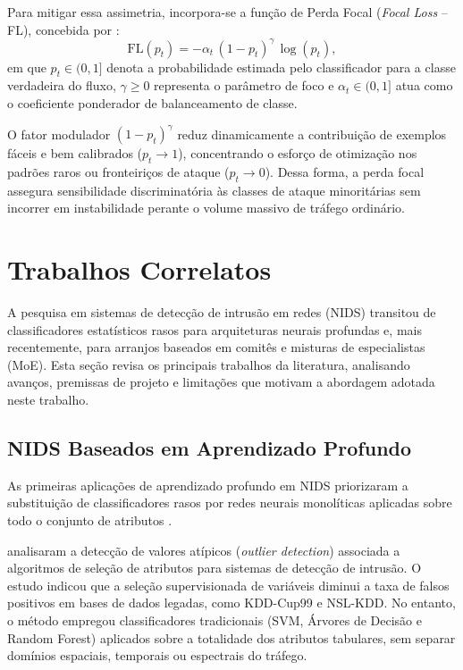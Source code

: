 Para mitigar essa assimetria, incorpora-se a função de Perda Focal (\emph{Focal Loss} -- FL), concebida por :
\begin{equation}
\label{eq:focal_loss_formula}
\mathrm{FL}(p_t) = -\alpha_t \, (1 - p_t)^\gamma \, \log(p_t),
\end{equation}
em que $p_t \in (0, 1]$ denota a probabilidade estimada pelo classificador para a classe verdadeira do fluxo, $\gamma \ge 0$ representa o parâmetro de foco e $\alpha_t \in (0, 1]$ atua como o coeficiente ponderador de balanceamento de classe.

O fator modulador $(1 - p_t)^\gamma$ reduz dinamicamente a contribuição de exemplos fáceis e bem calibrados ($p_t \to 1$), concentrando o esforço de otimização nos padrões raros ou fronteiriços de ataque ($p_t \to 0$). Dessa forma, a perda focal assegura sensibilidade discriminatória às classes de ataque minoritárias sem incorrer em instabilidade perante o volume massivo de tráfego ordinário.


\section{Trabalhos Correlatos}
\label{sec:trabalhos_correlatos}

A pesquisa em sistemas de detecção de intrusão em redes (NIDS) transitou de classificadores estatísticos rasos para
arquiteturas neurais profundas e, mais recentemente, para arranjos baseados em comitês e misturas de especialistas
(MoE). Esta seção revisa os principais trabalhos da literatura, analisando avanços, premissas de projeto e
limitações que motivam a abordagem adotada neste trabalho.

\subsection{NIDS Baseados em Aprendizado Profundo}
\label{subsec:correlatos_dl}

As primeiras aplicações de aprendizado profundo em NIDS priorizaram a substituição de classificadores rasos por
redes neurais monolíticas aplicadas sobre todo o conjunto de atributos \cite{survey2025dl}.

 analisaram a detecção de valores atípicos (\emph{outlier detection}) associada a algoritmos
de seleção de atributos para sistemas de detecção de intrusão. O estudo indicou que a seleção supervisionada de
variáveis diminui a taxa de falsos positivos em bases de dados legadas, como KDD-Cup99 e NSL-KDD. No entanto, o método
empregou classificadores tradicionais (SVM, Árvores de Decisão e Random Forest) aplicados sobre a totalidade dos
atributos tabulares, sem separar domínios espaciais, temporais ou espectrais do tráfego.

